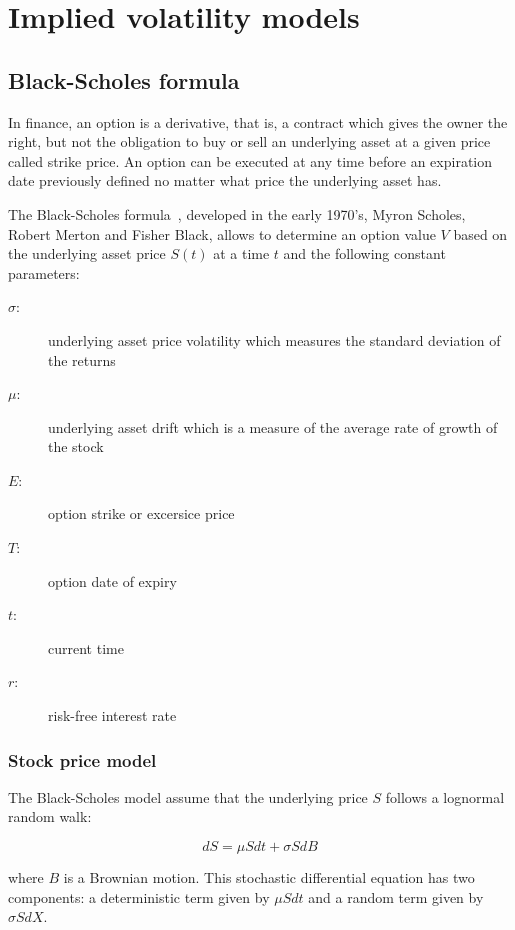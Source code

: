 
\chapter{Implied volatility models}

\section{Black-Scholes formula}

In finance, an option is a derivative, that is, a contract which gives the owner the right, but not the obligation to buy or sell an underlying asset at a given price called strike price. An option can be executed at any time before an expiration date previously defined no matter what price the underlying asset has. 

The Black-Scholes formula~\cite{black1973}, developed in the early 1970's, Myron Scholes, Robert Merton and Fisher Black,  allows to determine an option value $V$ based on the underlying asset price $S(t)$ at a time $t$ and the following constant parameters: 

\begin{description}
\item [$\sigma$:] underlying asset price volatility which measures the standard deviation of the returns
\item [$\mu$:] underlying asset drift which is a measure of the average rate of growth of the stock
\item[$E$:] option strike or excersice price
\item[$T$:] option date of expiry
\item[$t$:] current time
\item[$r$:] risk-free interest rate
\end{description}

\subsection{Stock price model}

The Black-Scholes model assume that the underlying price $S$ follows a lognormal random walk:

\begin{equation}\label{eq:stockprice}
dS = \mu S dt + \sigma S dB
\end{equation}

\noindent where $B$ is a Brownian motion. This stochastic differential equation has two components: a deterministic term given by $\mu S dt$ and a random term given by $\sigma S dX$.

